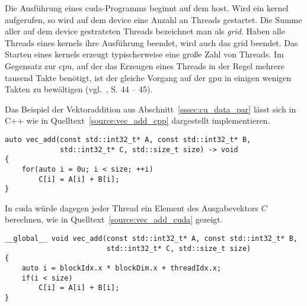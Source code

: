 Die Ausführung eines \gls{cuda}-Programms beginnt auf dem \gls{host}. Wird ein \gls{kernel} aufgerufen, so wird auf dem
\gls{device} eine Anzahl an Threads gestartet. Die Summe aller auf dem \gls{device} gestrateten Threads bezeichnet
man als \textit{\gls{grid}}. Haben alle Threads eines \gls{kernel}s ihre Ausführung beendet, wird auch das \gls{grid}
beendet.
Das Starten eines \gls{kernel}s erzeugt typischerweise eine große Zahl von Threads. Im Gegensatz zur \gls{cpu}, auf der
das Erzeugen eines Threads in der Regel mehrere tausend Takte benötigt, ist der gleiche Vorgang auf der \gls{gpu} in
einigen wenigen Takten zu bewältigen (vgl.~\cite{kirkhwu}, S. 44 -- 45).

Das Beispiel der Vektoraddition aus Abschnitt~\ref{sssec:cu_data_par} lässt sich in C++ wie in
Quelltext~\ref{source:vec_add_cpp} dargestellt implementieren. 

\begin{code}
\begin{verbatim}
auto vec_add(const std::int32_t* A, const std::int32_t* B,
             std::int32_t* C, std::size_t size) -> void
{
    for(auto i = 0u; i < size; ++i)
        C[i] = A[i] + B[i];
}
\end{verbatim}
\label{source:vec_add_cpp}
\end{code}

In \gls{cuda} würde dagegen jeder Thread ein Element des Ausgabevektors $C$ berechnen, wie in
Quelltext~\ref{source:vec_add_cuda} gezeigt.

\begin{code}
\begin{verbatim}
__global__ void vec_add(const std::int32_t* A, const std::int32_t* B,
                        std::int32_t* C, std::size_t size)
{
    auto i = blockIdx.x * blockDim.x + threadIdx.x;
    if(i < size)
        C[i] = A[i] + B[i];
}
\end{verbatim}
\label{source:vec_add_cuda}
\end{code}

